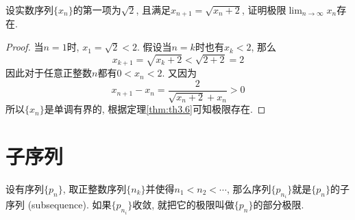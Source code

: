 \documentclass[cn,12pt,math=mtpro2,citestyle=gb7714-2015,bibstyle=gb7714-2015,twocol]{elegantbook}
\newcommand{\limn }{\lim_{n\to\infty}}
\begin{document}
\begin{example}
设实数序列$\{x_n\}$的第一项为$\sqrt{2}$, 且满足$x_{n+1}=\sqrt{x_n+2}$, 证明极限$\limn x_n$存在.
\end{example}
\begin{proof}
  当$n=1$时, $x_1=\sqrt{2}<2$. 假设当$n=k$时也有$x_k<2$, 那么
  $$x_{k+1}=\sqrt{x_k+2}<\sqrt{2+2}=2$$
  因此对于任意正整数$n$都有$0<x_n<2$. 又因为
  $$x_{n+1}-x_n=\frac{2}{\sqrt{x_n+2}+x_n}>0$$
  所以$\{x_n\}$是单调有界的, 根据定理\ref{thm:th3.6}可知极限存在.
\end{proof}

\section{子序列}
\begin{definition}\label{def:def3.1}
设有序列$\{p_n\}$, 取正整数序列$\{n_k\}$并使得$n_1<n_2<\cdots$, 那么序列$\{p_{n_i}\}$就是$\{p_n\}$的子序列 (subsequence). 如果$\{p_{n_i}\}$收敛, 就把它的极限叫做$\{p_n\}$的部分极限.
\end{definition}
\end{document}
